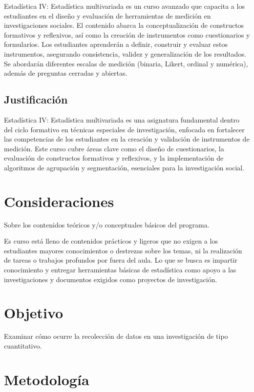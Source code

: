 \documentclass[
  letterpaper,
  DIV=11,
  numbers=noendperiod]{scrreprt}
\begin{document}
Estadística IV: Estadística multivariada es un curso avanzado que
capacita a los estudiantes en el diseño y evaluación de herramientas de
medición en investigaciones sociales. El contenido abarca la
conceptualización de constructos formativos y reflexivos, así como la
creación de instrumentos como cuestionarios y formularios. Los
estudiantes aprenderán a definir, construir y evaluar estos
instrumentos, asegurando consistencia, validez y generalización de los
resultados. Se abordarán diferentes escalas de medición (binaria,
Likert, ordinal y numérica), además de preguntas cerradas y abiertas.

\subsection{Justificación}\label{justificaciuxf3n-2}

Estadística IV: Estadística multivariada es una asignatura fundamental
dentro del ciclo formativo en técnicas especiales de investigación,
enfocada en fortalecer las competencias de los estudiantes en la
creación y validación de instrumentos de medición. Este curso cubre
áreas clave como el diseño de cuestionarios, la evaluación de
constructos formativos y reflexivos, y la implementación de algoritmos
de agrupación y segmentación, esenciales para la investigación social.

\section{Consideraciones}\label{consideraciones-1}

Sobre los contenidos teóricos y/o conceptuales básicos del programa.

Es curso está lleno de contenidos prácticos y ligeros que no exigen a
los estudiantes mayores conocimientos o destrezas sobre los temas, ni la
realización de tareas o trabajos profundos por fuera del aula. Lo que se
busca es impartir conocimiento y entregar herramientas básicas de
estadística como apoyo a las investigaciones y documentos exigidos como
proyectos de investigación.

\section{Objetivo}\label{objetivo-1}

Examinar cómo ocurre la recolección de datos en una investigación de
tipo cuantitativo.

\section{Metodología}\label{metodologuxeda-1}
\end{document}
